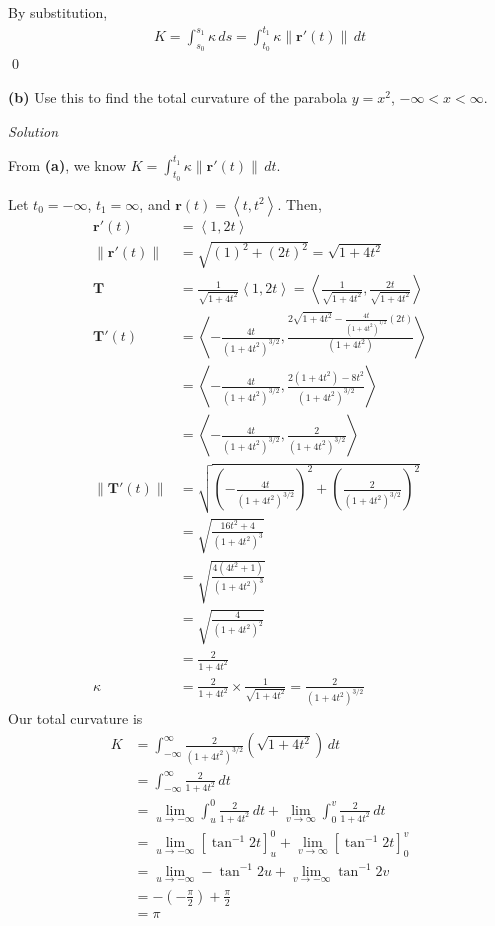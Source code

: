 \documentclass{article}
\newcommand{\lrp}[1]{\left( #1 \right)}
\newcommand{\lra}[1]{\left\langle #1 \right\rangle}
\newcommand{\lrb}[1]{\left[ #1 \right]}
\newcommand{\T}[0]{\mathbf{T}}
\renewcommand{\r}[0]{\mathbf{r}}
\newcommand{\Solution}{\textit{Solution}}
\begin{document}
By substitution,
\begin{align*}
   K=\int_{s_0}^{s_1} \kappa\,ds=\int_{t_0}^{t_1}\kappa\lVert \r'(t)\rVert\,dt
\end{align*}
\qed

{} \textbf{(b)} Use this to find the total curvature of the parabola $y=x^2$, $-\infty < x<\infty$.

\Solution

From \textbf{(a)}, we know $\displaystyle K=\int_{t_0}^{t_1} \kappa \lVert \r'(t)\rVert\,dt$.

Let $t_0=-\infty$, $t_1=\infty$, and $\mathbf{r}(t)=\lra{t,t^2}$. Then,
\begin{align*}
    \r'(t)&=\lra{1,2t}\\
    \lVert \r'(t)\rVert &=\sqrt{(1)^2+(2t)^2}=\sqrt{1+4t^2}\\
    \T &=\frac{1}{\sqrt{1+4t^2}}\lra{1,2t}=\lra{\frac{1}{\sqrt{1+4t^2}},\frac{2t}{\sqrt{1+4t^2}}}\\
    \T'(t)&=\lra{-\frac{4t}{(1+4t^2)^{3/2}},\frac{2\sqrt{1+4t^2}-\frac{4t}{(1+4t^2)^{1/2}}(2t)}{(1+4t^2)}}\\
    &=\lra{-\frac{4t}{(1+4t^2)^{3/2}},\frac{2(1+4t^2)-8t^2}{(1+4t^2)^{3/2}}}\\
    &=\lra{-\frac{4t}{(1+4t^2)^{3/2}},\frac{2}{(1+4t^2)^{3/2}}}\\
    \lVert \T'(t)\rVert &=\sqrt{\lrp{-\frac{4t}{(1+4t^2)^{3/2}}}^2+\lrp{\frac{2}{(1+4t^2)^{3/2}}}^2}\\
    &=\sqrt{\frac{16t^2+4}{(1+4t^2)^3}}\\
    &=\sqrt{\frac{4(4t^2+1)}{(1+4t^2)^3}}\\
    &=\sqrt{\frac{4}{(1+4t^2)^2}}\\
    &=\frac{2}{1+4t^2}\\
    \kappa&=\frac{2}{1+4t^2}\times \frac{1}{\sqrt{1+4t^2}}=\frac{2}{(1+4t^2)^{3/2}}
\end{align*}
Our total curvature is
\begin{align*}
    K&=\int_{-\infty}^{\infty}\frac{2}{(1+4t^2)^{3/2}}\lrp{\sqrt{1+4t^2}}\,dt\\
    &=\int_{-\infty}^{\infty}\frac{2}{1+4t^2}\,dt\\
    &=\lim_{u\to-\infty}\int_u^0\frac{2}{1+4t^2}\,dt+\lim_{v\to\infty}\int_0^v\frac{2}{1+4t^2}\,dt\\
    &=\lim_{u\to-\infty}\lrb{\tan^{-1} 2t}_u^0+\lim_{v\to\infty}\lrb{\tan^{-1}2t}_0^v\\
    &=\lim_{u\to-\infty} -\tan^{-1}2u + \lim_{v\to-\infty} \tan^{-1}2v\\
    &=-(-\frac{\pi}{2})+\frac{\pi}{2}\\
    &=\boxed{\pi}
\end{align*}
\end{document}
